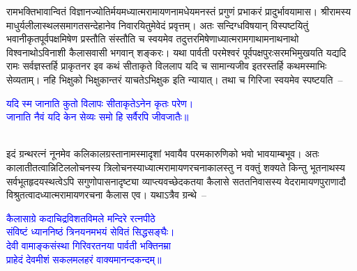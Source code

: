 \begin{sloppypar}
राम\-भक्ति\-भावान्वितं विज्ञान\-ज्योतिर्मयमध्यात्म\-रामायण\-नामधेयमनस्तं प्रगुणं प्रभाकरं प्रादुर्भावयामास। श्रीरामस्य माधुर्य\-लीला\-स्थल\-समागत\-सन्देहानेव निवारयितुमेवेदं प्रवृत्तम्। अतः सन्दिग्ध\-विषयान् विस्पष्टयितुं भवानी\-कृत\-पूर्व\-पक्ष\-मिषेण प्रस्तौति संस्तौति च स्वयमेव तदुत्तर\-मिषेणाध्यात्म\-राम\-गाथामनाथ\-नाथो विश्व\-नाथोऽविनाशी कैलास\-वासी भगवान् शङ्करः। यथा पार्वती परमेश्वरं पूर्व\-पक्ष\-पुरःसरमभिमुखयति यद्यदि रामः सर्वज्ञस्तर्हि प्राकृत\-नर इव कथं सीताकृते विललाप यदि च सामान्य\-जीव इतरस्तर्हि कथमस्माभिः सेव्यताम्। नहि भिक्षुको भिक्षुकान्तरं याचतेऽभिक्षुक इति न्यायात्। तथा च गिरिजा स्वयमेव स्पष्टयति~–\end{sloppypar}
\centering\textcolor{blue}{यदि स्म जानाति कुतो विलापः सीताकृतेऽनेन कृतः परेण।\nopagebreak\\
जानाति नैवं यदि केन सेव्यः समो हि सर्वैरपि जीवजातैः॥}\nopagebreak\\
\\
\begin{sloppypar}\justifying\noindent इदं ग्रन्थ\-रत्नं नूनमेव कलि\-काल\-ग्रस्तानामस्मादृशां भवायैव परम\-कारुणिको भवो भावयाम्बभूव। अतः कालातीतत्वान्निटिल\-लोचनस्य त्रि\-लोचनस्याध्यात्म\-रामायण\-रचना\-कालस्तु न वक्तुं शक्यते किन्तु भूत\-नाथस्य सर्व\-भूत\-हृदयस्थत्वेऽपि सगुणोपासना\-दृष्ट्या व्याप्त्यवच्छेदकतया कैलासे सतत\-निवासस्य वेद\-रामायण\-पुराणादौ विश्रुतत्वादध्यात्म\-रामायण\-रचना कैलास एव। यथाऽत्रैव ग्रन्थे~–\end{sloppypar}
\centering\textcolor{blue}{कैलासाग्रे कदाचिद्रविशतविमले मन्दिरे रत्नपीठे\nopagebreak\\
संविष्टं ध्याननिष्ठं त्रिनयनमभयं सेवितं सिद्धसङ्घैः।\nopagebreak\\
देवी वामाङ्कसंस्था गिरिवरतनया पार्वती भक्तिनम्रा\nopagebreak\\
प्राहेदं देवमीशं सकलमलहरं वाक्यमानन्दकन्दम्॥}\nopagebreak\\
\\
